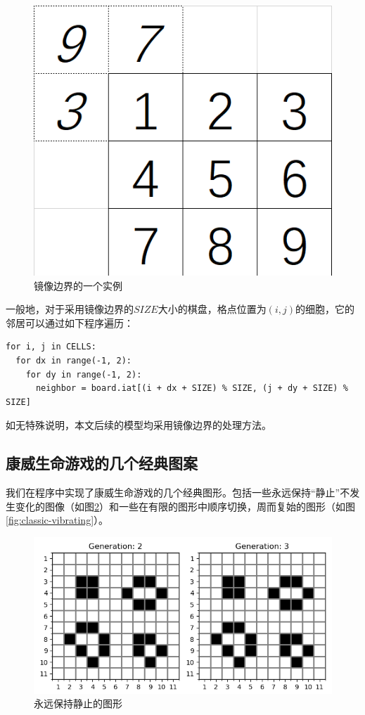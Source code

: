 \documentclass{ctexart}
\begin{document}
\begin{figure}[ht]
  \centering
  \includegraphics[scale=0.6]{mirror-edge-example.png}
  \caption{镜像边界的一个实例}
  \label{fig:mirror-edge-example}
\end{figure}

一般地，对于采用镜像边界的$SIZE$大小的棋盘，格点位置为$(i, j)$的细胞，它的邻居可以通过如下程序遍历：

\begin{lstlisting}[style = python]
for i, j in CELLS:
  for dx in range(-1, 2):
    for dy in range(-1, 2):
      neighbor = board.iat[(i + dx + SIZE) % SIZE, (j + dy + SIZE) % SIZE]
\end{lstlisting}

如无特殊说明，本文后续的模型均采用镜像边界的处理方法。

\subsection{康威生命游戏的几个经典图案}

我们在程序中实现了康威生命游戏的几个经典图形。包括一些永远保持“静止”不发生变化的图像（如图\ref{fig:classic-fixed}）和一些在有限的图形中顺序切换，周而复始的图形（如图\ref{fig:classic-vibrating}）。

\begin{figure}[ht]
  \centering
  \includegraphics[scale=0.75]{classic-fixed.png}
  \caption{永远保持静止的图形}
  \label{fig:classic-fixed}
\end{figure}
\end{document}

